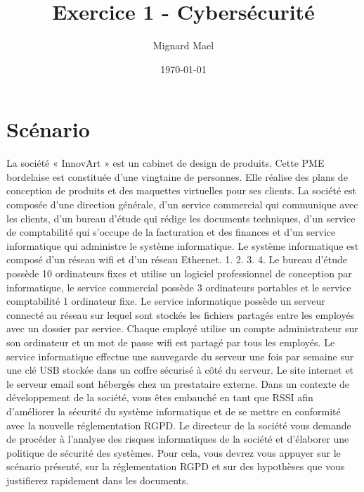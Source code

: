 \documentclass[a4paper,12pt]{article}
\title{Exercice 1 - Cybersécurité}
\author{Mignard Mael}
\date{\today}
\begin{document}
\maketitle

\section{Scénario}
La société « InnovArt » est un cabinet de design de produits. Cette PME bordelaise est
constituée d’une vingtaine de personnes. Elle réalise des plans de conception de produits et
des maquettes virtuelles pour ses clients.
La société est composée d'une direction générale, d'un service commercial qui communique
avec les clients, d'un bureau d'étude qui rédige les documents techniques, d'un service de
comptabilité qui s'occupe de la facturation et des finances et d'un service informatique qui
administre le système informatique.
Le système informatique est composé d'un réseau wifi et d'un réseau Ethernet.
1. 2. 3. 4. Le bureau d'étude possède 10 ordinateurs fixes et utilise un logiciel professionnel de
conception par informatique, le service commercial possède 3 ordinateurs portables
et le service comptabilité 1 ordinateur fixe.
Le service informatique possède un serveur connecté au réseau sur lequel sont
stockés les fichiers partagés entre les employés avec un dossier par service.
Chaque employé utilise un compte administrateur sur son ordinateur et un mot de
passe wifi est partagé par tous les employés.
Le service informatique effectue une sauvegarde du serveur une fois par semaine
sur une clé USB stockée dans un coffre sécurisé à côté du serveur. Le site internet et
le serveur email sont hébergés chez un prestataire externe.
Dans un contexte de développement de la société, vous êtes embauché en tant que RSSI
afin d'améliorer la sécurité du système informatique et de se mettre en conformité avec
la nouvelle réglementation RGPD. Le directeur de la société vous demande de procéder à
l'analyse des risques informatiques de la société et d'élaborer une politique de sécurité
des systèmes. Pour cela, vous devrez vous appuyer sur le scénario présenté, sur la
réglementation RGPD et sur des hypothèses que vous justifierez rapidement dans les
documents.

\clearpage
\end{document}

